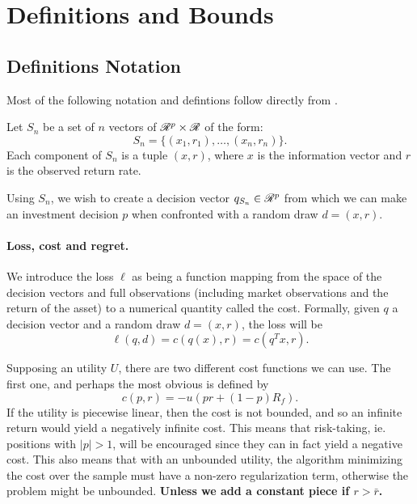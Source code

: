 \section{Definitions and Bounds}

\subsection{Definitions Notation}

Most of the following notation and defintions follow directly from \cite{bousquet2002}.

Let $S_n$ be a set of $n$ vectors of $\mathscr{R}^p\times\mathscr{R}$ of the form:
\begin{equation*}
  S_n = \{(x_1,r_1),\ldots,(x_n,r_n)\}.
\end{equation*}
Each component of $S_n$ is a tuple $(x,r)$, where $x$ is the information vector and $r$ is
the observed return rate.

Using $S_n$, we wish to create a decision vector $q_{S_n}\in\mathscr{R}^p$ from which we can
make an investment decision $p$  when confronted with a random draw $d=(x,r)$.

\paragraph{Loss, cost and regret.}
We introduce the loss $\ell$ as being a function mapping from the space of the decision
vectors and full observations (including market observations and the return of the asset)
to a numerical quantity called the cost. Formally, given $q$ a decision vector and a
random draw $d=(x,r)$, the loss will be
\begin{equation*}
\ell(q,d) = c(q(x),r) = c(q^Tx,r).
\end{equation*}

Supposing an utility $U$, there are two different cost functions we can use. The first
one, and perhaps the most obvious is defined by
\begin{equation*}
  c(p,r) = -u(pr + (1-p)R_f).
\end{equation*}
If the utility is piecewise linear, then the cost is not bounded, and so an infinite
return would yield a negatively infinite cost. This means that risk-taking, ie. positions
with $|p|>1$, will be encouraged since they can in fact yield a negative cost. This also
means that with an unbounded utility, the algorithm minimizing the cost over the sample
must have a non-zero regularization term, otherwise the problem might be
unbounded. \textbf{Unless we add a constant piece if $r>\bar r$.}

